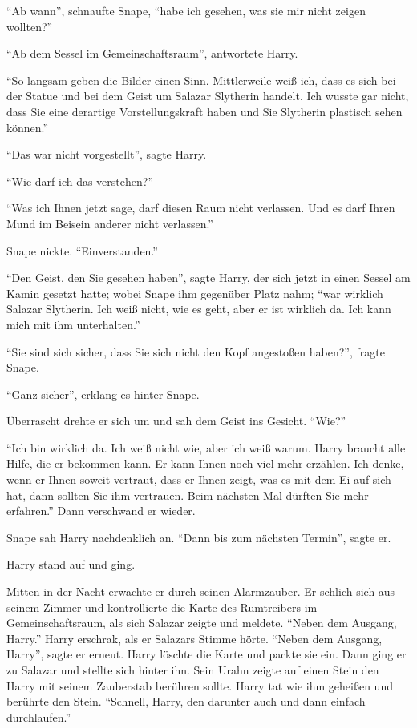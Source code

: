 \enquote{Ab wann}, schnaufte Snape, \enquote{habe ich gesehen, was sie mir nicht zeigen wollten?}

\enquote{Ab dem Sessel im Gemeinschaftsraum}, antwortete Harry.

\enquote{So langsam geben die Bilder einen Sinn. Mittlerweile weiß ich, dass es sich bei der Statue und bei dem Geist um Salazar Slytherin handelt. Ich wusste gar nicht, dass Sie eine derartige Vorstellungskraft haben und Sie Slytherin plastisch sehen können.}

\enquote{Das war nicht vorgestellt}, sagte Harry.

\enquote{Wie darf ich das verstehen?}

\enquote{Was ich Ihnen jetzt sage, darf diesen Raum nicht verlassen. Und es darf Ihren Mund im Beisein anderer nicht verlassen.}

Snape nickte. \enquote{Einverstanden.}

\enquote{Den Geist, den Sie gesehen haben}, sagte Harry, der sich jetzt in einen Sessel am Kamin gesetzt hatte; wobei Snape ihm gegenüber Platz nahm; \enquote{war wirklich Salazar Slytherin. Ich weiß nicht, wie es geht, aber er ist wirklich da. Ich kann mich mit ihm unterhalten.}

\enquote{Sie sind sich sicher, dass Sie sich nicht den Kopf angestoßen haben?}, fragte Snape.

\enquote{Ganz sicher}, erklang es hinter Snape.

Überrascht drehte er sich um und sah dem Geist ins Gesicht. \enquote{Wie?}

\enquote{Ich bin wirklich da. Ich weiß nicht wie, aber ich weiß warum. Harry braucht alle Hilfe, die er bekommen kann. Er kann Ihnen noch viel mehr erzählen. Ich denke, wenn er Ihnen soweit vertraut, dass er Ihnen zeigt, was es mit dem Ei auf sich hat, dann sollten Sie ihm vertrauen. Beim nächsten Mal dürften Sie mehr erfahren.} Dann verschwand er wieder.

Snape sah Harry nachdenklich an. \enquote{Dann bis zum nächsten Termin}, sagte er.

Harry stand auf und ging.

Mitten in der Nacht erwachte er durch seinen Alarmzauber. Er schlich sich aus seinem Zimmer und kontrollierte die Karte des Rumtreibers im Gemeinschaftsraum, als sich Salazar zeigte und meldete. \enquote{Neben dem Ausgang, Harry.} Harry erschrak, als er Salazars Stimme hörte. \enquote{Neben dem Ausgang, Harry}, sagte er erneut. Harry löschte die Karte und packte sie ein. Dann ging er zu Salazar und stellte sich hinter ihn. Sein Urahn zeigte auf einen Stein den Harry mit seinem Zauberstab berühren sollte. Harry tat wie ihm geheißen und berührte den Stein. \enquote{Schnell, Harry, den darunter auch und dann einfach durchlaufen.}

